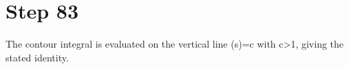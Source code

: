 \section*{Step 83}

The contour integral is evaluated on the vertical line \Re(s)=c with c>1, giving the stated identity.
